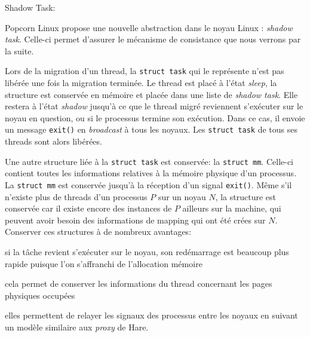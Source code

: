       \begin{paragraph}{Shadow Task:}

        Popcorn Linux propose une nouvelle abstraction dans le noyau Linux :
        \textit{shadow task}. Celle-ci permet d'assurer le mécanisme de
        consistance que nous verrons par la suite.

        Lors de la migration d'un thread, la \texttt{struct task} qui le
        représente n'est pas libérée une fois la migration terminée. Le thread
        est placé à l'état \textit{sleep}, la structure est conservée en mémoire
        et placée dans une liste de \textit{shadow task}. Elle restera à l'état
        \textit{shadow} jusqu'à ce que le thread migré reviennent s'exécuter sur
        le noyau en question, ou si le processus termine son exécution. Dans ce
        cas, il envoie un message \texttt{exit()} en \textit{broadcast} à tous
        les noyaux. Les \texttt{struct task} de tous ses threads sont alors
        libérées.

        Une autre structure liée à la \texttt{struct task} est conservée: la
        \texttt{struct mm}. Celle-ci contient toutes les informations relatives
        à la mémoire physique d'un processus. La \texttt{struct mm} est
        conservée jusqu'à la réception d'un signal \texttt{exit()}. Même s'il
        n'existe plus de threads d'un processus $P$ sur un noyau $N$, la
        structure est conservée car il existe encore des instances de $P$
        ailleurs sur la machine, qui peuvent avoir besoin des informations de
        mapping qui ont été crées sur $N$.\\

        Conserver ces structures à de nombreux avantages:\benumline \item si la
        tâche revient s'exécuter sur le noyau, son redémarrage est beaucoup plus
        rapide puisque l'on s'affranchi de l'allocation mémoire \item cela
        permet de conserver les informations du thread concernant les pages
        physiques occupées \item elles permettent de relayer les signaux des
        processus entre les noyaux en suivant un modèle similaire aux
        \textit{proxy} de Hare\eenumline.

      \end{paragraph}

